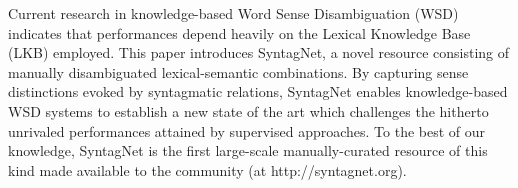 Current research in knowledge-based Word Sense Disambiguation (WSD) indicates that performances depend heavily on the Lexical Knowledge Base (LKB) employed. 
This paper introduces SyntagNet, a novel resource consisting of manually disambiguated lexical-semantic combinations. By capturing sense distinctions evoked by syntagmatic relations, SyntagNet enables knowledge-based WSD systems to establish a new state of the art which challenges the hitherto unrivaled performances attained by supervised approaches.
To the best of our knowledge, SyntagNet is the first large-scale manually-curated resource of this kind made available to the community (at http://syntagnet.org).